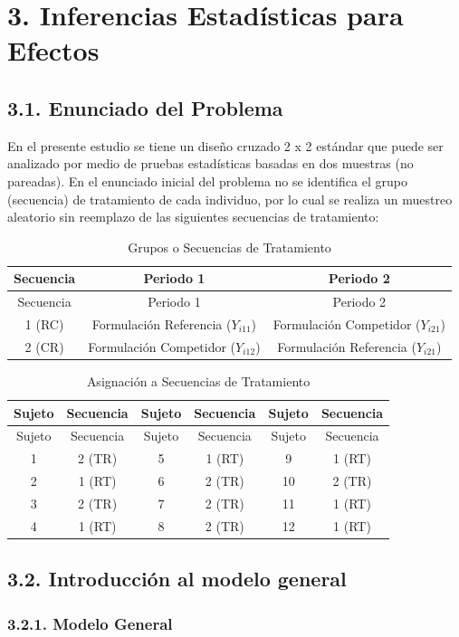 \documentclass[]{article}
\begin{document}
\section{3. Inferencias Estadísticas para
Efectos}\label{inferencias-estadisticas-para-efectos}

\subsection{3.1. Enunciado del Problema}\label{enunciado-del-problema}

En el presente estudio se tiene un diseño cruzado 2 x 2 estándar que
puede ser analizado por medio de pruebas estadísticas basadas en dos
muestras (no pareadas). En el enunciado inicial del problema no se
identifica el grupo (secuencia) de tratamiento de cada individuo, por lo
cual se realiza un muestreo aleatorio sin reemplazo de las siguientes
secuencias de tratamiento:

\begin{longtable}[]{@{}ccc@{}}
\caption{Grupos o Secuencias de Tratamiento}\tabularnewline
\toprule
Secuencia & Periodo 1 & Periodo 2\tabularnewline
\midrule
\endfirsthead
\toprule
Secuencia & Periodo 1 & Periodo 2\tabularnewline
\midrule
\endhead
1 (RC) & Formulación Referencia (\(Y_{i11}\)) & Formulación Competidor
(\(Y_{i21}\))\tabularnewline
2 (CR) & Formulación Competidor (\(Y_{i12}\)) & Formulación Referencia
(\(Y_{i21}\))\tabularnewline
\bottomrule
\end{longtable}

\begin{longtable}[]{@{}cccccc@{}}
\caption{Asignación a Secuencias de Tratamiento}\tabularnewline
\toprule
Sujeto & Secuencia & Sujeto & Secuencia & Sujeto &
Secuencia\tabularnewline
\midrule
\endfirsthead
\toprule
Sujeto & Secuencia & Sujeto & Secuencia & Sujeto &
Secuencia\tabularnewline
\midrule
\endhead
1 & 2 (TR) & 5 & 1 (RT) & 9 & 1 (RT)\tabularnewline
2 & 1 (RT) & 6 & 2 (TR) & 10 & 2 (TR)\tabularnewline
3 & 2 (TR) & 7 & 2 (TR) & 11 & 1 (RT)\tabularnewline
4 & 1 (RT) & 8 & 2 (TR) & 12 & 1 (RT)\tabularnewline
\bottomrule
\end{longtable}

\subsection{3.2. Introducción al modelo
general}\label{introduccion-al-modelo-general}

\subsubsection{3.2.1. Modelo General}\label{modelo-general}
\end{document}
